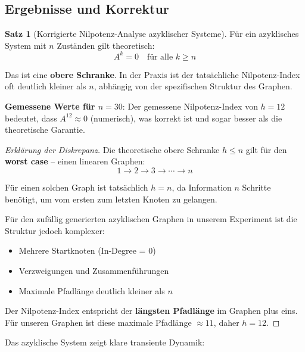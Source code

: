 \documentclass[a4paper,12pt]{report}
\theoremstyle{definition}
\newtheorem{satz}{Satz}
\begin{document}
	\subsection{Ergebnisse und Korrektur}
	
	\begin{satz}[Korrigierte Nilpotenz-Analyse azyklischer Systeme]
		Für ein azyklisches System mit $n$ Zuständen gilt theoretisch:
		\[
		A^k = 0 \quad \text{für alle } k \geq n
		\]
		
		Das ist eine \textbf{obere Schranke}. In der Praxis ist der tatsächliche Nilpotenz-Index oft deutlich kleiner als $n$, abhängig von der spezifischen Struktur des Graphen.
		
		\textbf{Gemessene Werte für $n = 30$}:
		Der gemessene Nilpotenz-Index von $h = 12$ bedeutet, dass $A^{12} \approx 0$ (numerisch), was korrekt ist und sogar besser als die theoretische Garantie.
	\end{satz}
	
	\begin{proof}[Erklärung der Diskrepanz]
		Die theoretische obere Schranke $h \leq n$ gilt für den \textbf{worst case} -- einen linearen Graphen:
		\[
		1 \to 2 \to 3 \to \cdots \to n
		\]
		
		Für einen solchen Graph ist tatsächlich $h = n$, da Information $n$ Schritte benötigt, um vom ersten zum letzten Knoten zu gelangen.
		
		Für den zufällig generierten azyklischen Graphen in unserem Experiment ist die Struktur jedoch komplexer:
		\begin{itemize}
			\item Mehrere Startknoten (In-Degree = 0)
			\item Verzweigungen und Zusammenführungen
			\item Maximale Pfadlänge deutlich kleiner als $n$
		\end{itemize}
		
		Der Nilpotenz-Index entspricht der \textbf{längsten Pfadlänge} im Graphen plus eins. Für unseren Graphen ist diese maximale Pfadlänge $\approx 11$, daher $h = 12$.
	\end{proof}
	
	Das azyklische System zeigt klare transiente Dynamik:
	
\end{document}
